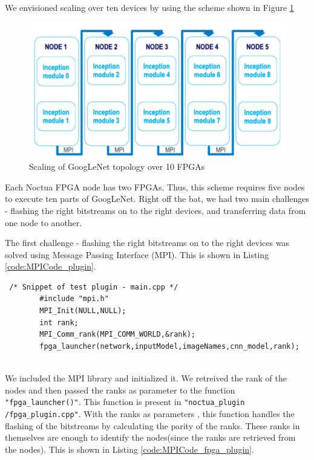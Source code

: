 We envisioned scaling over ten devices by using the scheme shown in Figure \ref{fig:GoogLeNet_Scaling}

\begin{figure}[h!]
  \includegraphics[width=\textwidth,height=\textheight,keepaspectratio]{img/GoogLeNet_Scaling.png}
  \caption{Scaling of GoogLeNet topology over 10 FPGAs}
  \label{fig:GoogLeNet_Scaling}
\end{figure}

Each Noctua FPGA node has two FPGAs. Thus, this scheme requires five nodes to execute ten parts of GoogLeNet. Right off the bat, we had two main challenges - flashing the right bitstreams on to the right devices, and transferring data from one node to another.

The first challenge - flashing the right bitstreams on to the right devices was solved using Message Passing Interface (MPI). This is shown in Listing \ref{code:MPICode_plugin}.  


\begin{code}[!htb]
 \begin{verbatim}
 /* Snippet of test plugin - main.cpp */
        #include "mpi.h"
        MPI_Init(NULL,NULL);
        int rank;
        MPI_Comm_rank(MPI_COMM_WORLD,&rank);
        fpga_launcher(network,inputModel,imageNames,cnn_model,rank);
    
\end{verbatim}
\label{code:MPICode_plugin}
\end{code}

We included the MPI library and initialized it. We retreived the rank of the nodes and then passed the ranks as parameter to the function \texttt{"fpga\_launcher()"}. This function is present in \texttt{"noctua\_plugin /fpga\_plugin.cpp"}. With the ranks as parameters , this function handles the flashing of the bitstreams by calculating the parity of the ranks. These ranks in themselves are enough to identify the nodes(since the ranks are retrieved from the nodes). This is shown in Listing \ref{code:MPICode_fpga_plugin}.

